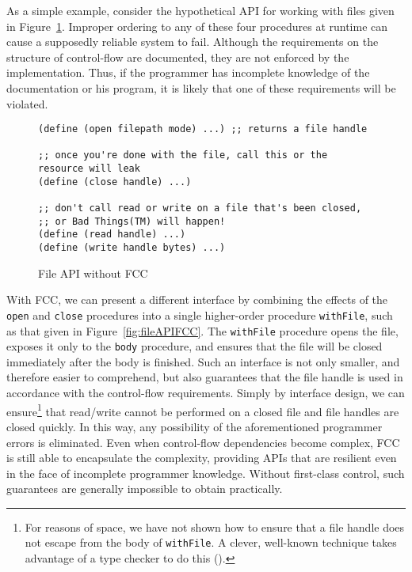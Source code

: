 \documentclass[11pt]{article}
\begin{document}
As a simple example, consider the hypothetical API for working with files given in Figure~\ref{fig:fileAPInoFCC}.
Improper ordering to any of these four procedures at runtime can cause a supposedly reliable system to fail.
Although the requirements on the structure of control-flow are documented, they are not enforced by the implementation.
Thus, if the programmer has incomplete knowledge of the documentation or his program, it is likely that one of these requirements will be violated.

\begin{figure}[H]
\caption{File API without FCC}
\label{fig:fileAPInoFCC}
\begin{verbatim}
(define (open filepath mode) ...) ;; returns a file handle

;; once you're done with the file, call this or the resource will leak
(define (close handle) ...)

;; don't call read or write on a file that's been closed,
;; or Bad Things(TM) will happen!
(define (read handle) ...)
(define (write handle bytes) ...)
\end{verbatim}
\end{figure}

With FCC, we can present a different interface by combining the effects of the \texttt{open} and \texttt{close} procedures into a single higher-order procedure \texttt{withFile}, such as that given in Figure~\ref{fig:fileAPIFCC}.
The \texttt{withFile} procedure opens the file, exposes it only to the \texttt{body} procedure, and ensures that the file will be closed immediately after the body is finished.
Such an interface is not only smaller, and therefore easier to comprehend, but also guarantees that the file handle is used in accordance with the control-flow requirements.
Simply by interface design, we can ensure\footnote{For reasons of space, we have not shown how to ensure that a file handle does not escape from the body of \texttt{withFile}. A clever, well-known technique takes advantage of a type checker to do this (\cite{StateInHaskell}).} that read/write cannot be performed on a closed file and file handles are closed quickly.
In this way, any possibility of the aforementioned programmer errors is eliminated.
Even when control-flow dependencies become complex, FCC is still able to encapsulate the complexity, providing APIs that are resilient even in the face of incomplete programmer knowledge.
Without first-class control, such guarantees are generally impossible to obtain practically.
\end{document}
